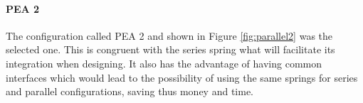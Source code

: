 \paragraph{PEA 2} %
\label{par:pea_2}
The configuration called PEA 2 and shown in Figure \ref{fig:parallel2} was the selected one.
This is congruent with the series spring what will facilitate its integration when designing.
It also has the advantage of having common interfaces which would lead to the possibility of using the same springs for series and parallel configurations, saving thus money and time.




